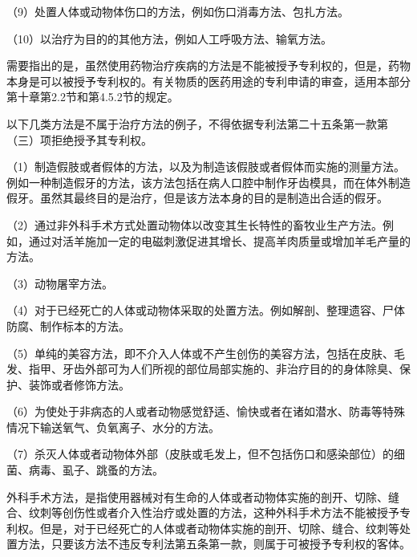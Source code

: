 {\setlength{\parindent}{17.1bp}（9）处置人体或动物体伤口的方法，例如伤口消毒方法、包扎方法。\par}

{\setlength{\parindent}{17.1bp}（10）以治疗为目的的其他方法，例如人工呼吸方法、输氧方法。\par}

需要指出的是，虽然使用药物治疗疾病的方法是不能被授予专利权的，但是，药物本身是可以被授予专利权的。有关物质的医药用途的专利申请的审查，适用本部分第十章第2.2节和第4.5.2节的规定。

以下几类方法是不属于治疗方法的例子，不得依据专利法第二十五条第一款第（三）项拒绝授予其专利权。

{\setlength{\parindent}{17.1bp}（1）制造假肢或者假体的方法，以及为制造该假肢或者假体而实施的测量方法。例如一种制造假牙的方法，该方法包括在病人口腔中制作牙齿模具，而在体外制造假牙。虽然其最终目的是治疗，但是该方法本身的目的是制造出合适的假牙。\par}

{\setlength{\parindent}{17.1bp}（2）通过非外科手术方式处置动物体以改变其生长特性的畜牧业生产方法。例如，通过对活羊施加一定的电磁刺激促进其增长、提高羊肉质量或增加羊毛产量的方法。\par}

{\setlength{\parindent}{17.1bp}（3）动物屠宰方法。\par}

{\setlength{\parindent}{17.1bp}（4）对于已经死亡的人体或动物体采取的处置方法。例如解剖、整理遗容、尸体防腐、制作标本的方法。\par}

{\setlength{\parindent}{17.1bp}（5）单纯的美容方法，即不介入人体或不产生创伤的美容方法，包括在皮肤、毛发、指甲、牙齿外部可为人们所视的部位局部实施的、非治疗目的的身体除臭、保护、装饰或者修饰方法。\par}

{\setlength{\parindent}{17.1bp}（6）为使处于非病态的人或者动物感觉舒适、愉快或者在诸如潜水、防毒等特殊情况下输送氧气、负氧离子、水分的方法。\par}

{\setlength{\parindent}{17.1bp}（7）杀灭人体或者动物体外部（皮肤或毛发上，但不包括伤口和感染部位）的细菌、病毒、虱子、跳蚤的方法。\par}

外科手术方法，是指使用器械对有生命的人体或者动物体实施的剖开、切除、缝合、纹刺等创伤性或者介入性治疗或处置的方法，这种外科手术方法不能被授予专利权。但是，对于已经死亡的人体或者动物体实施的剖开、切除、缝合、纹刺等处置方法，只要该方法不违反专利法第五条第一款，则属于可被授予专利权的客体。

